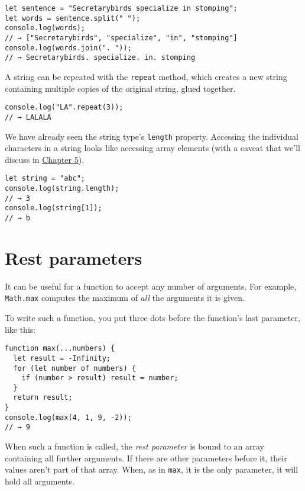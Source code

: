 \begin{lstlisting}
let sentence = "Secretarybirds specialize in stomping";
let words = sentence.split(" ");
console.log(words);
// → ["Secretarybirds", "specialize", "in", "stomping"]
console.log(words.join(". "));
// → Secretarybirds. specialize. in. stomping
\end{lstlisting}
\noindent{}

A string can be repeated with the \lstinline`repeat` method, which creates a new string containing multiple copies of the original string, glued together.

\begin{lstlisting}
console.log("LA".repeat(3));
// → LALALA
\end{lstlisting}
\noindent{}

We have already seen the string type's \lstinline`length` property. Accessing the individual characters in a string looks like accessing array elements (with a caveat that we'll discuss in \hyperref[higher_order.code_units]{Chapter 5}).

\begin{lstlisting}
let string = "abc";
console.log(string.length);
// → 3
console.log(string[1]);
// → b
\end{lstlisting}
\noindent

\label{data.rest_parameters}\section{Rest parameters}

It can be useful for a function to accept any number of arguments. For example, \lstinline`Math.max` computes the maximum of \emph{all} the arguments it is given.

To write such a function, you put three dots before the function's last parameter, like this:

\begin{lstlisting}
function max(...numbers) {
  let result = -Infinity;
  for (let number of numbers) {
    if (number > result) result = number;
  }
  return result;
}
console.log(max(4, 1, 9, -2));
// → 9
\end{lstlisting}
\noindent

When such a function is called, the \emph{rest parameter} is bound to an array containing all further arguments. If there are other parameters before it, their values aren't part of that array. When, as in \lstinline`max`, it is the only parameter, it will hold all arguments.

